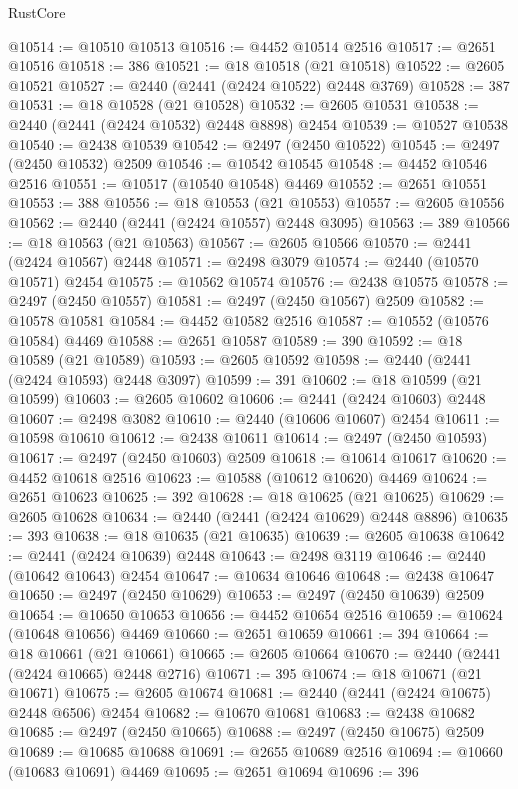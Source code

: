 \begin{lexlean}{RustCore}
\begin{coremodule}
@10514 := @10510 @10513
@10516 := @4452 @10514 @2516
@10517 := @2651 @10516
@10518 := 386
@10521 := @18 @10518 (@21 @10518)
@10522 := @2605 @10521
@10527 := @2440 (@2441 (@2424 @10522) @2448 @3769)
@10528 := 387
@10531 := @18 @10528 (@21 @10528)
@10532 := @2605 @10531
@10538 := @2440 (@2441 (@2424 @10532) @2448 @8898) @2454
@10539 := @10527 @10538
@10540 := @2438 @10539
@10542 := @2497 (@2450 @10522)
@10545 := @2497 (@2450 @10532) @2509
@10546 := @10542 @10545
@10548 := @4452 @10546 @2516
@10551 := @10517 (@10540 @10548) @4469
@10552 := @2651 @10551
@10553 := 388
@10556 := @18 @10553 (@21 @10553)
@10557 := @2605 @10556
@10562 := @2440 (@2441 (@2424 @10557) @2448 @3095)
@10563 := 389
@10566 := @18 @10563 (@21 @10563)
@10567 := @2605 @10566
@10570 := @2441 (@2424 @10567) @2448
@10571 := @2498 @3079
@10574 := @2440 (@10570 @10571) @2454
@10575 := @10562 @10574
@10576 := @2438 @10575
@10578 := @2497 (@2450 @10557)
@10581 := @2497 (@2450 @10567) @2509
@10582 := @10578 @10581
@10584 := @4452 @10582 @2516
@10587 := @10552 (@10576 @10584) @4469
@10588 := @2651 @10587
@10589 := 390
@10592 := @18 @10589 (@21 @10589)
@10593 := @2605 @10592
@10598 := @2440 (@2441 (@2424 @10593) @2448 @3097)
@10599 := 391
@10602 := @18 @10599 (@21 @10599)
@10603 := @2605 @10602
@10606 := @2441 (@2424 @10603) @2448
@10607 := @2498 @3082
@10610 := @2440 (@10606 @10607) @2454
@10611 := @10598 @10610
@10612 := @2438 @10611
@10614 := @2497 (@2450 @10593)
@10617 := @2497 (@2450 @10603) @2509
@10618 := @10614 @10617
@10620 := @4452 @10618 @2516
@10623 := @10588 (@10612 @10620) @4469
@10624 := @2651 @10623
@10625 := 392
@10628 := @18 @10625 (@21 @10625)
@10629 := @2605 @10628
@10634 := @2440 (@2441 (@2424 @10629) @2448 @8896)
@10635 := 393
@10638 := @18 @10635 (@21 @10635)
@10639 := @2605 @10638
@10642 := @2441 (@2424 @10639) @2448
@10643 := @2498 @3119
@10646 := @2440 (@10642 @10643) @2454
@10647 := @10634 @10646
@10648 := @2438 @10647
@10650 := @2497 (@2450 @10629)
@10653 := @2497 (@2450 @10639) @2509
@10654 := @10650 @10653
@10656 := @4452 @10654 @2516
@10659 := @10624 (@10648 @10656) @4469
@10660 := @2651 @10659
@10661 := 394
@10664 := @18 @10661 (@21 @10661)
@10665 := @2605 @10664
@10670 := @2440 (@2441 (@2424 @10665) @2448 @2716)
@10671 := 395
@10674 := @18 @10671 (@21 @10671)
@10675 := @2605 @10674
@10681 := @2440 (@2441 (@2424 @10675) @2448 @6506) @2454
@10682 := @10670 @10681
@10683 := @2438 @10682
@10685 := @2497 (@2450 @10665)
@10688 := @2497 (@2450 @10675) @2509
@10689 := @10685 @10688
@10691 := @2655 @10689 @2516
@10694 := @10660 (@10683 @10691) @4469
@10695 := @2651 @10694
@10696 := 396

\end{coremodule}
\end{lexlean}
